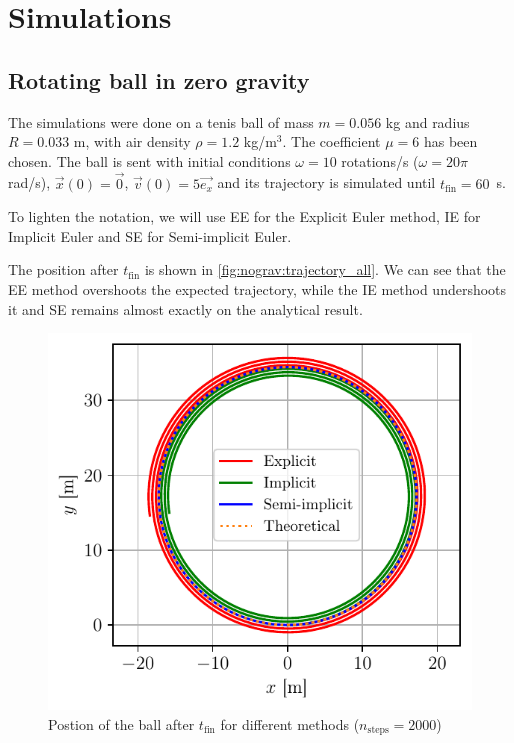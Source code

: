 \section{Simulations}

\subsection{Rotating ball in zero gravity}

The simulations were done on a tenis ball of mass $m = 0.056$ kg and radius $R = 0.033$ m, with air density $\rho = 1.2$ kg/m$^3$. The coefficient $\mu = 6$ has been chosen. The ball is sent with initial conditions $\omega = 10$ rotations/s ($\omega = 20\pi$ rad/s), $\vec{x}(0) = \vec{0}$, $\vec{v}(0) = 5 \vec{e_x}$ and its trajectory is simulated until \mbox{$t_\textrm{fin} = 60$ s}.

To lighten the notation, we will use EE for the Explicit Euler method, IE for Implicit Euler and SE for Semi-implicit Euler.

The position after $t_\textrm{fin}$ is shown in \autoref{fig:nograv:trajectory_all}. We can see that the EE method overshoots the expected trajectory, while the IE method undershoots it and SE remains almost exactly on the analytical result.
\begin{figure}
    \centering
    \includegraphics[width=0.85\linewidth]{figures/nograv_trajectory_all.pdf}
    \caption{Postion of the ball after $t_\textrm{fin}$ for different methods ($n_\textrm{steps} = 2000$)}
    \label{fig:nograv:trajectory_all}
    \vspace*{-1cm}
\end{figure}


